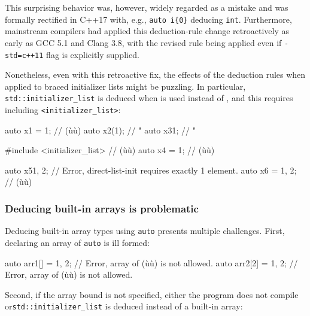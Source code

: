 \noindent This surprising behavior was, however, widely regarded as a mistake and
was formally rectified in C++17 with, e.g., \lstinline!auto!~\lstinline!i{0}!
deducing \lstinline!int!. Furthermore, mainstream compilers had applied
this deduction-rule change retroactively as early as GCC 5.1 and Clang
3.8, with the revised rule being applied even if \lstinline!-std=c++11!
flag is explicitly supplied.

Nonetheless, even with this retroactive fix, the effects of the
deduction rules when applied to braced initializer lists might be
puzzling. In particular, \lstinline!std::initializer_list! is deduced when
 is used instead of
, and this requires including \lstinline!<initializer_list>!:

\begin{emcppslisting}
auto x1 = 1;    // (ù{}ù)
auto x2(1);     //   "
auto x3{1};     //   "

#include <initializer_list>  // (ù{}ù)
auto x4 = {1};  // (ù{}ù)

auto x5{1, 2};     // Error, direct-list-init requires exactly 1 element.
auto x6 = {1, 2};  // (ù{}ù)
\end{emcppslisting}
    

\subsubsection[Deducing built-in arrays is problematic]{Deducing built-in arrays is problematic}\label{deducing-built-in-arrays-is-problematic}

Deducing built-in array types using \lstinline!auto! presents multiple
challenges. First, declaring an array of \lstinline!auto! is ill formed:

\begin{emcppslisting}
auto arr1[]  = {1, 2};  // Error, array of (ù{}ù) is not allowed.
auto arr2[2] = {1, 2};  // Error, array of (ù{}ù) is not allowed.
\end{emcppslisting}
    
\noindent Second, if the array bound is not specified, either the program does not
compile or\linebreak[4]%
 \lstinline!std::initializer_list! is deduced instead of a
built-in array:

